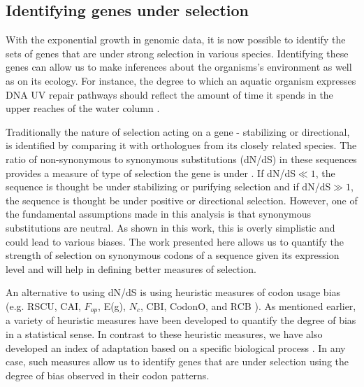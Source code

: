 \subsection{Identifying genes under selection}
With the exponential growth in genomic data, it is now possible to identify the sets of genes that are under strong selection in various species.
Identifying these genes can allow us to make inferences about the organisms's environment as well as on its ecology.
For instance, the degree to which an aquatic organism expresses DNA UV repair pathways should reflect the amount of time it spends in the upper reaches of the water column \citep{BumaEtAl03}.

Traditionally the nature of selection acting on a gene - stabilizing or directional, is identified by comparing it with orthologues from its closely related species.
The ratio of non-synonymous to synonymous substitutions (dN/dS) in these sequences provides a measure of type of selection the gene is under \citep{NeiAndGojobori86,Yang98}.
If dN/dS$\ll1$, the sequence is thought be under stabilizing or purifying selection and if dN/dS$\gg1$, the sequence is thought be under positive or directional selection.
However, one of the fundamental assumptions made in this analysis is that synonymous substitutions are neutral.
As shown in this work, this is overly simplistic and could lead to various biases.
The work presented here allows us to quantify the strength of selection on synonymous codons of a sequence given its expression level and will help in defining better measures of selection.

An alternative to using dN/dS is using heuristic measures of codon usage bias (e.g. RSCU, CAI, $F_{op}$, E(g), $N_c$, CBI, CodonO, and RCB \citep{SharpAndLi87,Ikemura81,KarlinAndMrazek00,Wright90,BennetzenAndHall82,WanEtAl06}).
As mentioned earlier, a variety of heuristic measures have been developed to quantify the degree of bias in a statistical sense.
In contrast to these heuristic measures, we have also developed an index of adaptation based on a specific biological process \citep{GilchristEtAl09}.
In any case, such measures allow us to identify genes that are under selection using the degree of bias observed in their codon patterns.

